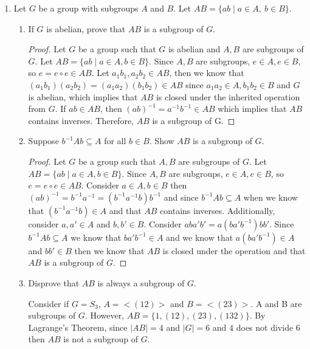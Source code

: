 \documentclass[11pt]{article}
\begin{document}
\begin{enumerate}

\item Let $G$ be a group with subgroups $A$ and $B$.  Let 
$AB = \{ab \mid a \in A,\ b \in B\}$.
\begin{enumerate}
\item If $G$ is abelian, prove that $AB$ is a subgroup of $G$.

\begin{proof}
Let $G$ be a group such that $G$ is abelian and $A, B$ are subgroups of $G$. Let $AB = \{ ab\mid a\in A, b\in B\}.$ Since $A, B$ are subgroups, $e\in A, e\in B$, so $e=e\circ e\in AB$. Let $a_1b_1, a_2b_2\in AB$, then we know that $(a_1b_1)(a_2b_2)=(a_1a_2)(b_1b_2)\in AB$ since $a_1a_2\in A, b_1b_2\in B$ and $G$ is abelian, which implies that $AB$ is closed under the inherited operation from $G$. If $ab\in AB$, then $(ab)^{-1}=a^{-1}b^{-1}\in AB$ which implies that $AB$ contains inverses. Therefore, $AB$ is a subgroup of G.
\end{proof}

\item Suppose $b^{-1} A b \subseteq A$ for all $b \in B$.  
Show $AB$ is a subgroup of $G$.

\begin{proof}
Let $G$ be a group such that $A, B$ are subgroups of $G$. Let $AB= \{ab\mid a\in A, b\in B\}.$ Since $A, B$ are subgroups, $e\in A, e\in B$, so $e=e\circ e\in AB$. Consider $a\in A, b\in B$ then $(ab)^{-1}=b^{-1}a^{-1}=(b^{-1}a^{-1}b)b^{-1}$ and since $b^{-1}Ab\subseteq A$ when we know that $(b^{-1}a^{-1}b)\in A$ and that $AB$ contains inverses. Additionally, consider $a, a'\in A$ and $b, b'\in B$. Consider $aba'b'=a(ba'b^{-1})bb'$. Since $b^{-1}Ab\subseteq A$ we know that $ba'b^{-1}\in A$ and we know that $a(ba'b^{-1})\in A$ and $bb'\in B$ then we know that $AB$ is closed under the operation and that $AB$ is a subgroup of $G$. 
\end{proof}

\item Disprove that $AB$ is always a subgroup of $G$.

Consider if $G=S_3$, $A=<(12)>$ and $B=<(23)>.$ A and B are subgroups of $G$. However, $AB=\{1, (12), (23), (132)\}$. By Lagrange's Theorem, since $|AB|=4$ and $|G|=6$ and $4$ does not divide $6$ then $AB$ is not a subgroup of $G$.

\end{enumerate}




\end{enumerate}
\end{document}
